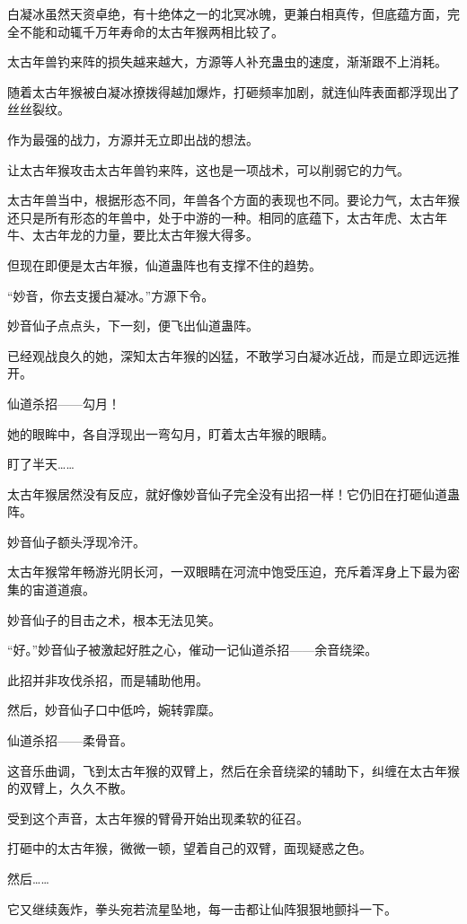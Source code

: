 \begin{this_body}
白凝冰虽然天资卓绝，有十绝体之一的北冥冰魄，更兼白相真传，但底蕴方面，完全不能和动辄千万年寿命的太古年猴两相比较了。

太古年兽钓来阵的损失越来越大，方源等人补充蛊虫的速度，渐渐跟不上消耗。

随着太古年猴被白凝冰撩拨得越加爆炸，打砸频率加剧，就连仙阵表面都浮现出了丝丝裂纹。

作为最强的战力，方源并无立即出战的想法。

让太古年猴攻击太古年兽钓来阵，这也是一项战术，可以削弱它的力气。

太古年兽当中，根据形态不同，年兽各个方面的表现也不同。要论力气，太古年猴还只是所有形态的年兽中，处于中游的一种。相同的底蕴下，太古年虎、太古年牛、太古年龙的力量，要比太古年猴大得多。

但现在即便是太古年猴，仙道蛊阵也有支撑不住的趋势。

“妙音，你去支援白凝冰。”方源下令。

妙音仙子点点头，下一刻，便飞出仙道蛊阵。

已经观战良久的她，深知太古年猴的凶猛，不敢学习白凝冰近战，而是立即远远推开。

仙道杀招——勾月！

她的眼眸中，各自浮现出一弯勾月，盯着太古年猴的眼睛。

盯了半天……

太古年猴居然没有反应，就好像妙音仙子完全没有出招一样！它仍旧在打砸仙道蛊阵。

妙音仙子额头浮现冷汗。

太古年猴常年畅游光阴长河，一双眼睛在河流中饱受压迫，充斥着浑身上下最为密集的宙道道痕。

妙音仙子的目击之术，根本无法见笑。

“好。”妙音仙子被激起好胜之心，催动一记仙道杀招——余音绕梁。

此招并非攻伐杀招，而是辅助他用。

然后，妙音仙子口中低吟，婉转霏糜。

仙道杀招——柔骨音。

这音乐曲调，飞到太古年猴的双臂上，然后在余音绕梁的辅助下，纠缠在太古年猴的双臂上，久久不散。

受到这个声音，太古年猴的臂骨开始出现柔软的征召。

打砸中的太古年猴，微微一顿，望着自己的双臂，面现疑惑之色。

然后……

它又继续轰炸，拳头宛若流星坠地，每一击都让仙阵狠狠地颤抖一下。


\end{this_body}
